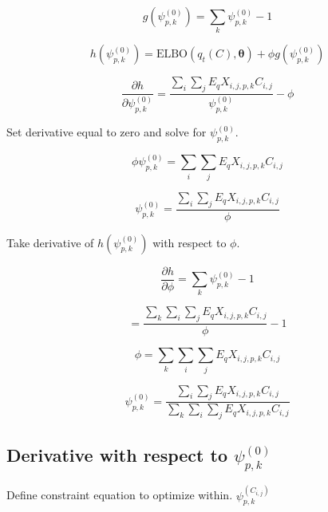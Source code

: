 \documentclass[12pt]{article}
\theoremstyle{definition}
\begin{document}
\begin{equation}
	g(\psi_{p, k}^{(0)}) = \sum_{k}\psi_{p, k}^{(0)} - 1 
\end{equation}

\begin{equation}
h(\psi_{p, k}^{(0)}) = \textrm{ELBO}(q_{t}(C), \boldsymbol{\theta}) + \phi g(\psi_{p, k}^{(0)})
\end{equation}

\begin{equation}
\frac{\partial{h}}{\partial{\psi_{p, k}^{(0)}}} = \frac{\sum_{i}\sum_{j}E_{q} X_{i,j,p,k} C_{i,j}}{\psi_{p, k}^{(0)}} - \phi
\end{equation}

Set derivative equal to zero and solve for $\psi_{p, k}^{(0)}$.

\begin{equation}
	\phi \psi_{p, k}^{(0)} = \sum_{i}\sum_{j}E_{q} X_{i,j,p,k} C_{i,j}
\end{equation}

\begin{equation}
\psi_{p, k}^{(0)} = \frac{\sum_{i}\sum_{j}E_{q} X_{i,j,p,k} C_{i,j}}{\phi}
\end{equation}

Take derivative of $h(\psi_{p, k}^{(0)})$ with respect to $\phi$.

\begin{equation}
\frac{\partial{h}}{\partial{\phi}} = \sum_{k}\psi_{p, k}^{(0)} - 1
\end{equation}

\begin{equation}
=\frac{\sum_{k}\sum_{i}\sum_{j}E_{q} X_{i,j,p,k} C_{i,j}}{\phi} - 1
\end{equation}

\begin{equation}
	\phi = \sum_{k}\sum_{i}\sum_{j}E_{q} X_{i,j,p,k} C_{i,j}
\end{equation}

\begin{equation}
\psi_{p, k}^{(0)} = \frac{\sum_{i}\sum_{j}E_{q} X_{i,j,p,k} C_{i,j}}{\sum_{k}\sum_{i}\sum_{j}E_{q} X_{i,j,p,k} C_{i,j}}
\end{equation}


\subsection{Derivative with respect to $\psi_{p, k}^{(0)}$}

Define constraint equation to optimize within. $\psi_{p, k}^{(C_{i, j})}$
\end{document}
